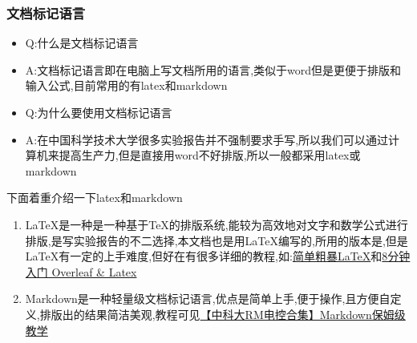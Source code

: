 \documentclass{ctexart}
\begin{document}
\subsubsection{文档标记语言}
\begin{itemize}
    \item Q:什么是文档标记语言
    \item A:文档标记语言即在电脑上写文档所用的语言,类似于word但是更便于排版和输入公式,目前常用的有latex和markdown
    \item Q:为什么要使用文档标记语言
    \item A:在中国科学技术大学很多实验报告并不强制要求手写,所以我们可以通过计算机来提高生产力,但是直接用word不好排版,所以一般都采用latex或markdown
\end{itemize}
\par 下面着重介绍一下latex和markdown
\begin{enumerate}
    \item \LaTeX 是一种是一种基于\TeX 的排版系统,能较为高效地对文字和数学公式进行排版,是写实验报告的不二选择,本文档也是用\LaTeX 编写的,所用的版本是\LaTeXe ,但是\LaTeX 有一定的上手难度,但好在有很多详细的教程,如:\href{https://github.com/kiri236/Guide-for-exchange-student-in-USTC/blob/main/PDF/Latex/%E7%AE%80%E5%8D%95%E7%B2%97%E6%9A%B4latex.pdf}{简单粗暴\LaTeX}和\href{https://www.bilibili.com/video/BV1cg411V7hW/?spm_id_from=333.337.search-card.all.click}{8分钟入门 Overleaf \& Latex}
    \item Markdown是一种轻量级文档标记语言,优点是简单上手,便于操作,且方便自定义,排版出的结果简洁美观,教程可见\href{https://www.bilibili.com/video/BV172421w7Ba/?spm_id_from=333.337.search-card.all.click}{【中科大RM电控合集】Markdown保姆级教学}%
\end{enumerate}
\end{document}
